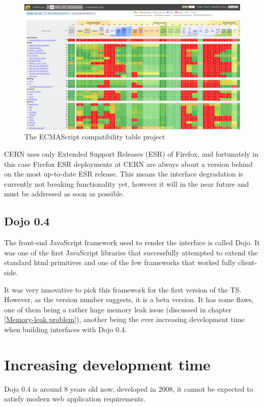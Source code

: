 \begin{figure}
  \centering
  \includegraphics[width=\textwidth]{images/compattable}
  \caption{The ECMAScript compatibility table project}
  \label{fig:compattable}
\end{figure}


CERN uses only Extended Support Releases (ESR) of Firefox, and fortunately in
this case Firefox ESR deployments at CERN are always about a version behind on
the most up-to-date ESR release.
This means the interface degradation is currently not breaking functionality yet,
however it will in the near future and must be addressed as soon as possible.

\subsection{Dojo 0.4}
The front-end JavaScript framework used to render the interface is called Dojo.
It was one of the first JavaScript libraries that successfully attempted to extend
the standard html primitives and one of the few frameworks that worked fully
client-side.

It was very innovative to pick this framework for the first version of the TS.
However, as the version number suggests, it is a beta version. It has some flaws,
one of them being a rather huge memory leak issue (discussed in chapter \ref{Memory-leak problem}),
another being the ever increasing development time when building interfaces with
Dojo 0.4.

\section{Increasing development time}
Dojo 0.4 is around 8 years old now, developed in 2008\cite{TS_PHD}, it cannot be expected to
satisfy modern web application requirements.

